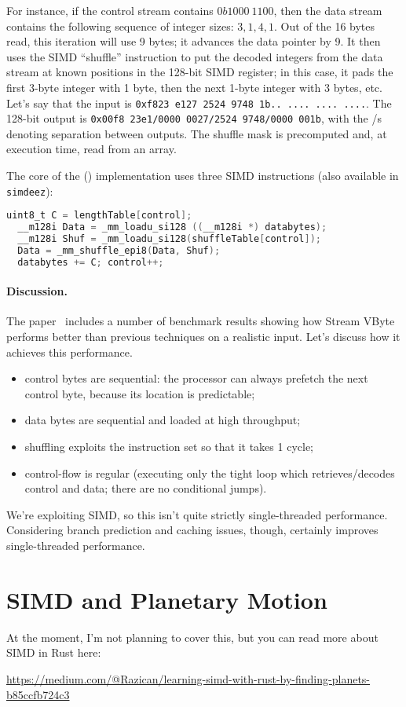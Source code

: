 For instance, if the control stream contains $0b1000~1100$, then the data stream
contains the following sequence of integer sizes: $3, 1, 4, 1$. Out of the 16 bytes read,
this iteration will use 9 bytes; it advances the data pointer by 9. It then uses the SIMD
``shuffle'' instruction to put the decoded integers from the data stream at known positions in the
128-bit SIMD register; in this case, it pads the first 3-byte integer with 1 byte, then
the next 1-byte integer with 3 bytes, etc. Let's say that the input is
{\tt 0xf823~e127~2524~9748~1b..~....~....~....}. The 128-bit output is
{\tt 0x00f8~23e1/0000~0027/2524 9748/0000~001b}, with the /s denoting separation
between outputs. The shuffle mask is precomputed and, at
execution time, read from an array.

The core of the (\CPP) implementation uses three SIMD instructions (also available in \texttt{simdeez}):
\begin{lstlisting}[language=C]
  uint8_t C = lengthTable[control];
  __m128i Data = _mm_loadu_si128 ((__m128i *) databytes);
  __m128i Shuf = _mm_loadu_si128(shuffleTable[control]);
  Data = _mm_shuffle_epi8(Data, Shuf);
  databytes += C; control++;
\end{lstlisting}

\paragraph{Discussion.} The paper~\cite{LEMIRE20181} includes a number of benchmark results
showing how Stream VByte performs better than previous techniques on a realistic input.
Let's discuss how it achieves this performance.

\begin{itemize}[noitemsep]
\item control bytes are sequential: the processor can always prefetch the next control byte, because
its location is predictable;
\item data bytes are sequential and loaded at high throughput;
\item shuffling exploits the instruction set so that it takes 1 cycle;
\item control-flow is regular (executing only the tight loop which retrieves/decodes control
and data; there are no conditional jumps).
\end{itemize}
We're exploiting SIMD, so this isn't quite strictly single-threaded performance.
Considering branch prediction and caching issues, though,
certainly improves single-threaded performance.

\section*{SIMD and Planetary Motion}

At the moment, I'm not planning to cover this, but you can read more about SIMD
in Rust here:
\begin{center}
\url{https://medium.com/@Razican/learning-simd-with-rust-by-finding-planets-b85ccfb724c3}
\end{center}




